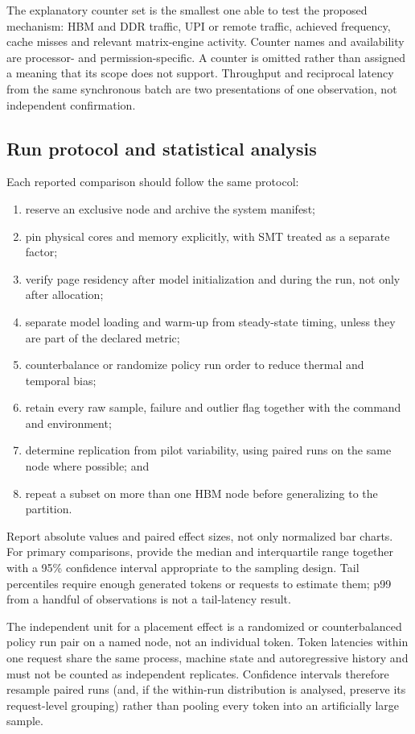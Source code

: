 The explanatory counter set is the smallest one able to test the proposed
mechanism: HBM and DDR traffic, UPI or remote traffic, achieved frequency,
cache misses and relevant matrix-engine activity.  Counter names and
availability are processor- and permission-specific.  A counter is
omitted rather than assigned a meaning that its scope does not support.
Throughput and reciprocal latency from the same synchronous batch are two
presentations of one observation, not independent confirmation.

\subsection{Run protocol and statistical analysis}

Each reported comparison should follow the same protocol:

\begin{enumerate}
  \item reserve an exclusive node and archive the system manifest;
  \item pin physical cores and memory explicitly, with SMT treated as a
        separate factor;
  \item verify page residency after model initialization and during the
        run, not only after allocation;
  \item separate model loading and warm-up from steady-state timing,
        unless they are part of the declared metric;
  \item counterbalance or randomize policy run order to reduce
        thermal and temporal bias;
  \item retain every raw sample, failure and outlier flag together with
        the command and environment;
  \item determine replication from pilot variability, using paired runs
        on the same node where possible; and
  \item repeat a subset on more than one HBM node before generalizing to
        the partition.
\end{enumerate}

Report absolute values and paired effect sizes, not only normalized bar
charts.  For primary comparisons, provide the median and interquartile
range together with a 95\% confidence interval appropriate to the
sampling design.  Tail percentiles require enough generated tokens or
requests to estimate them; p99 from a handful of observations is not a
tail-latency result.

The independent unit for a placement effect is a randomized or
counterbalanced policy run pair on a named node, not an individual
token.  Token latencies within one request share the same process,
machine state and autoregressive history and must not be counted as
independent replicates.  Confidence intervals therefore resample paired
runs (and, if the within-run distribution is analysed, preserve its
request-level grouping) rather than pooling every token into an
artificially large sample.

